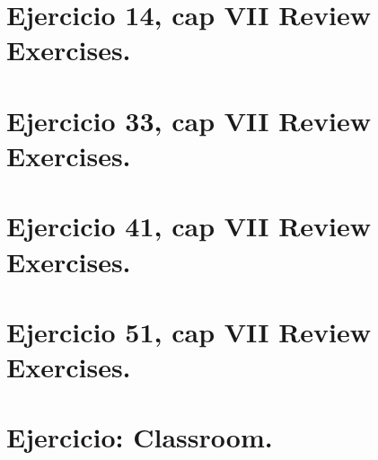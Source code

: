 \documentclass[11pt,letterpaper]{article}
\begin{document}
\section{Ejercicio 14, cap VII Review Exercises.}

\section{Ejercicio 33, cap VII Review Exercises.}

\section{Ejercicio 41, cap VII Review Exercises.}

\section{Ejercicio 51, cap VII Review Exercises.}


\section{Ejercicio: Classroom.}
\end{document}
